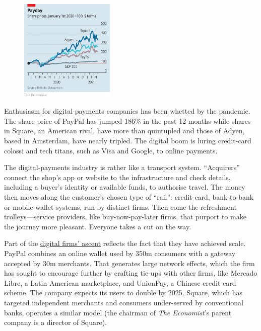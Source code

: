 \documentclass{article}
\begin{document}
\begin{figure}[h]
\centering
\includegraphics[width=0.4\textwidth]{images/20210327_fnc253.png}
\end{figure}


Enthusiasm for digital-payments companies has been whetted by the pandemic. The share price of PayPal has jumped 186\% in the past 12 months while shares in Square, an American rival, have more than quintupled and those of Adyen, based in Amsterdam, have nearly tripled. The digital boom is luring credit-card colossi and tech titans, such as Visa and Google, to online payments. 

 

The digital-payments industry is rather like a transport system. ``Acquirers'' connect the shop's app or website to the infrastructure and check details, including a buyer's identity or available funds, to authorise travel. The money then moves along the customer's chosen type of ``rail'': credit-card, bank-to-bank or mobile-wallet systems, run by distinct firms. Then come the refreshment trolleys---service providers, like buy-now-pay-later firms, that purport to make the journey more pleasant. Everyone takes a cut on the way. 

Part of the \href{/finance-and-economics/2020/10/03/mastercard-and-visa-seek-to-get-the-most-out-of-the-digital-payments-boom}{digital firms' ascent} reflects the fact that they have achieved scale. PayPal combines an online wallet used by 350m consumers with a gateway accepted by 30m merchants. That generates large network effects, which the firm has sought to encourage further by crafting tie-ups with other firms, like Mercado Libre, a Latin American marketplace, and UnionPay, a Chinese credit-card scheme. The company expects its users to double by 2025. Square, which has targeted independent merchants and consumers under-served by conventional banks, operates a similar model (the chairman of \emph{The Economist}'s parent company is a director of Square). 
\end{document}
